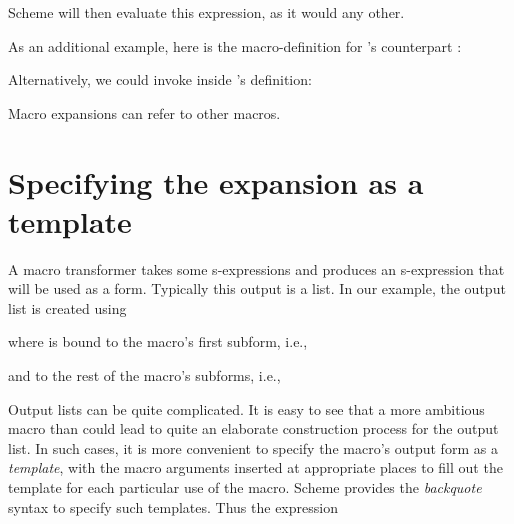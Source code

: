 
\n Scheme will then evaluate this expression, as it
  would any other.


As an additional example, here is the macro-definition
for ’s counterpart :


\n Alternatively, we could invoke  inside
  ’s definition:


\n Macro expansions can refer to other macros.

\section{Specifying the expansion as a template}

A macro transformer takes some s-expressions and
produces an s-expression that will be used as a form.
Typically this output is a list.  In our
 example, the output list is created using


\n where  is bound to the macro’s first
  subform, i.e.,


\n and  to the rest of the macro’s subforms,
i.e.,



\n 
Output lists can be quite complicated.  It is easy to
see that a more ambitious macro than  could
lead to quite an elaborate construction process for the
output list.  In such cases, it is more convenient to
specify the macro’s output form as a {\em template},
with the macro arguments inserted at appropriate places
to fill out the template for each particular use of the
macro.  Scheme provides the {\em backquote} syntax to
specify such templates.    Thus the expression

